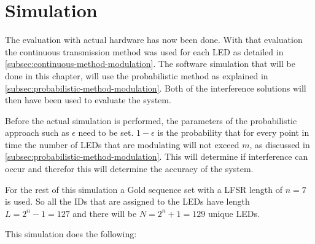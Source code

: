 
\section{Simulation}
\label{sec:simulation-evaluation}

The evaluation with actual hardware has now been done.
With that evaluation the continuous transmission method was used for each LED as detailed in \autoref{subsec:continuous-method-modulation}.
The software simulation that will be done in this chapter, will use the probabilistic method as explained in \autoref{subsec:probabilistic-method-modulation}.
Both of the interference solutions will then have been used to evaluate the system.




Before the actual simulation is performed, the parameters of the probabilistic approach such as $\epsilon$ need to be set.
$1 - \epsilon$ is the probability that for every point in time the number of LEDs that are modulating will not exceed $m$, as discussed in \autoref{subsec:probabilistic-method-modulation}.
This will determine if interference can occur and therefor this will determine the accuracy of the system.

For the rest of this simulation a Gold sequence set with a LFSR length of $n = 7$ is used.
So all the IDs that are assigned to the LEDs have length $L = 2^n - 1 = 127$ and there will be $N = 2^n + 1 = 129$ unique LEDs.

This simulation does the following: 

